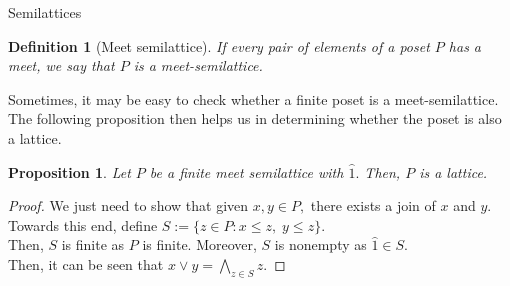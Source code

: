 \documentclass[handout, aspectratio=169]{beamer}
\newtheorem{defn}{Definition}
\newtheorem{prop}{Proposition}
\begin{document}
\begin{frame}{Semilattices}
	\begin{defn}[Meet semilattice]
		If every pair of elements of a poset $P$ has a meet, we say that $P$ is a meet-semilattice.
	\end{defn}
	Sometimes, it may be easy to check whether a finite poset is a meet-semilattice. The following proposition then helps us in determining whether the poset is also a lattice.
	\begin{prop}
		Let $P$ be a finite meet semilattice with $\hat{1}.$ Then, $P$ is a lattice.
	\end{prop}
	\begin{proof}
		We just need to show that given $x, y \in P,$ there exists a join of $x$ and $y.$\\
		Towards this end, define $S := \{z \in P : x \le z,\;y \le z\}.$\\
		Then, $S$ is finite as $P$ is finite. Moreover, $S$ is nonempty as $\hat{1} \in S.$\\
		Then, it can be seen that $x \vee y = \displaystyle\bigwedge_{z \in S}z.$
	\end{proof}
\end{frame}
	
\end{document}
